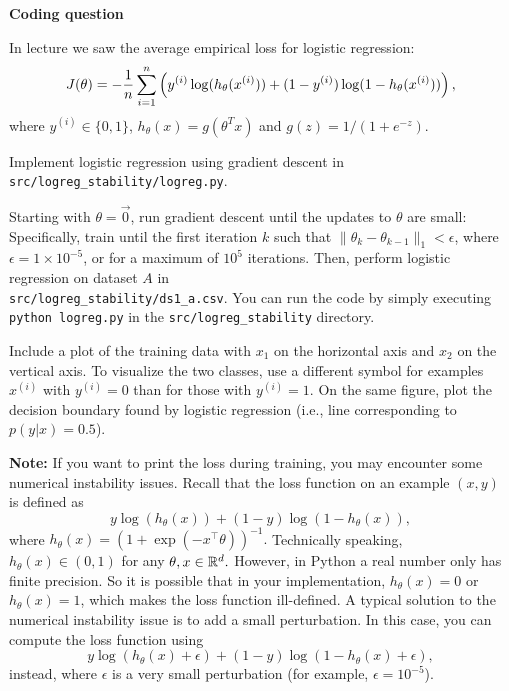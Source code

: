 \item {} \textbf{Coding question}

In lecture we saw the average empirical loss for logistic regression:
\begin{equation*}
	J(\theta)
	= -\frac{1}{{n}} \sum_{i=1}^{n} \left(y^{(i)}\log(h_{\theta}(x^{(i)}))
		+  (1 - y^{(i)})\log(1 - h_{\theta}(x^{(i)}))\right),
\end{equation*}
where $y^{(i)} \in \{0, 1\}$, $h_\theta(x) = g(\theta^T x)$ and
$g(z) = 1 / (1 + e^{-z})$.

Implement logistic regression using gradient descent in
\texttt{src/logreg\_stability/logreg.py}.

Starting with $\theta = \vec{0}$, run gradient descent until the updates to
$\theta$ are small: Specifically, train until the first iteration $k$ such
that $\|\theta_{k} - \theta_{k-1}\|_1 < \epsilon$, where
$\epsilon = 1\times 10^{-5}$, or for a maximum of $10^5$ iterations. Then, perform logistic regression on dataset $A$ in \\
\texttt{src/logreg\_stability/ds1\_a.csv}. You can run the code by simply executing
\texttt{python logreg.py} in the \texttt{src/logreg\_stability} directory.

Include a plot of the training data with $x_1$ on the horizontal axis and $x_2$ on the vertical axis.
To visualize the two classes, use a different symbol for examples $x^{(i)}$
with $y^{(i)} = 0$ than for those with $y^{(i)} = 1$. On the same figure, plot the decision boundary
found by logistic regression (i.e., line corresponding to $p(y|x) = 0.5$).

\textbf{Note:} If you want to print the loss during training, you may encounter some numerical instability issues. Recall that the loss function on an example $(x,y)$ is defined as
$$y\log(h_{\theta}(x)) +  (1 - y)\log(1 - h_{\theta}(x)),$$
where $h_\theta(x)=(1+\exp(-x^\top \theta))^{-1}.$ Technically speaking, $h_{\theta}(x)\in(0,1)$ for any $\theta,x\in\mathbb{R}^{d}.$ However, in Python a real number only has finite precision. So it is possible that in your implementation, $h_{\theta}(x)=0$ or $h_{\theta}(x)=1$, which makes the loss function ill-defined. A typical solution to the numerical instability issue is to add a small perturbation. In this case, you can compute the loss function using
$$y\log(h_{\theta}(x) + \epsilon) +  (1 - y)\log(1 - h_{\theta}(x) + \epsilon),$$
instead, where $\epsilon$ is a very small perturbation (for example, $\epsilon=10^{-5}$).
